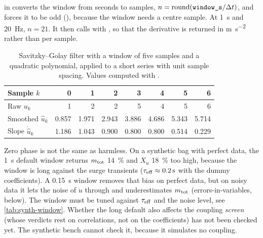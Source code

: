 \begin{incode}
 in  converts the
window from seconds to samples, $n = \operatorname{round}(\code{window_s}/\Delta t)$, and forces it
to be odd (), because the window needs a centre sample. At \qty{1}{\second} and
\qty{20}{\hertz}, $n = 21$. It then calls  with ,
so that the derivative is returned in \si{\metre\per\second\squared} rather than per sample.
\end{incode}

\begin{table}[htbp]
  \centering
  \caption{Savitzky--Golay filter with a window of five samples and a quadratic polynomial,
    applied to a short series with unit sample spacing. Values computed with
    .}
  \label{tab:sg-example}
  \begin{tabular}{lrrrrrrr}
    \toprule
    Sample $k$ & 0 & 1 & 2 & 3 & 4 & 5 & 6 \\
    \midrule
    Raw $u_k$ & 1 & 2 & 2 & 5 & 4 & 5 & 6 \\
    Smoothed $\hat u_k$ & 0.857 & 1.971 & 2.943 & 3.886 & 4.686 & 5.343 & 5.714 \\
    Slope $\dot{\hat u}_k$ & 1.186 & 1.043 & 0.900 & 0.800 & 0.800 & 0.514 & 0.229 \\
    \bottomrule
  \end{tabular}
\end{table}
\FloatBarrier

\begin{revised}[title=Added 14 October 2026: the window length biases the fit]
Zero phase is not the same as harmless. On a synthetic bag with perfect data, the
\qty{1}{\second} default window returns $m_\mathrm{tot}$ \qty{14}{\percent} and $X_u$ \qty{18}{\percent}
too high, because the window is long against the surge transients ($\tau_\mathrm{eff} \approx
\qty{0.2}{\second}$ with the dummy coefficients). A \qty{0.15}{\second} window removes that bias
on perfect data, but on noisy data it lets the noise of $\dot u$ through and underestimates
$m_\mathrm{tot}$ (errors-in-variables, below). The window must be tuned against $\tau_\mathrm{eff}$ and the noise
level, see \cref{tab:synth-window}. Whether the long default also affects the coupling
\emph{screen} (whose verdicts rest on correlations, not on the coefficients) has not been
checked yet. The synthetic bench cannot check it, because it simulates no coupling.
\end{revised}

